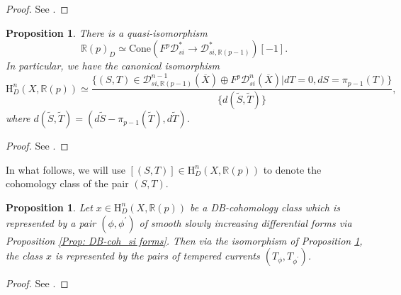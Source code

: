 \documentclass[11pt, a4paper]{amsart}
\theoremstyle{plain}
\newtheorem{proposition}[theorem]{Proposition}
\theoremstyle{definition}
\numberwithin{equation}{section}
\def\RR{\mathbb{R}}
\begin{document}
\begin{proof}
    See \cite[Proposition 2.23]{BCLRJ24}. 
\end{proof}

\begin{proposition}
\label{Prop: DB-coh_temperd currents}
    There is a quasi-isomorphism 
    \begin{equation*}
        \RR(p)_{D} \simeq \mathrm{Cone}(F^{p}\mathcal{D}^{*}_{si} \rightarrow \mathcal{D}_{si, \RR(p-1)}^{*})[-1].
    \end{equation*}
    In particular, we have the canonical isomorphism 
    \begin{equation}
        \mathrm{H}_{D}^{n}(X, \RR(p)) \simeq \frac{\{ (S, T) \in  \mathcal{D}_{si, \RR(p-1)}^{n - 1}(\overline{X}) \oplus F^{p} \mathcal{D}_{si}^{n}(\overline{X}) | d T = 0, d S = \pi_{p - 1}(T)  \}}{ \{ d(\tilde{S}, \tilde{T})\}}, 
    \end{equation}
    where $d(\tilde{S}, \tilde{T}) = (d \tilde{S} - \pi_{p -1}(\tilde{T}), d\tilde{T})$. 
\end{proposition}

\begin{proof}
    See \cite[Theorem 2.25]{BCLRJ24}. 
\end{proof}

In what follows, we will use $[(S, T)] \in \mathrm{H}_{D}^{n}(X, \RR(p))$ to denote the cohomology class of the pair $(S, T)$. 


\begin{proposition}
\label{Prop: DB-cohomology-si forms to tempered currents}
    Let $x \in  \mathrm{H}_{D}^{n}(X, \RR(p))$ be a DB-cohomology class which is represented by a pair $(\phi, \phi^{\prime})$ of smooth slowly increasing differential forms via Proposition \ref{Prop: DB-coh_si forms}. Then via the isomorphism of Proposition \ref{Prop: DB-coh_temperd currents}, the class $x$ is represented by the pairs of tempered currents $(T_{\phi}, T_{\phi^{\prime}})$. 
\end{proposition} 

\begin{proof}
    See \cite[Proposition 2.26]{BCLRJ24}. 
\end{proof}
\end{document}
